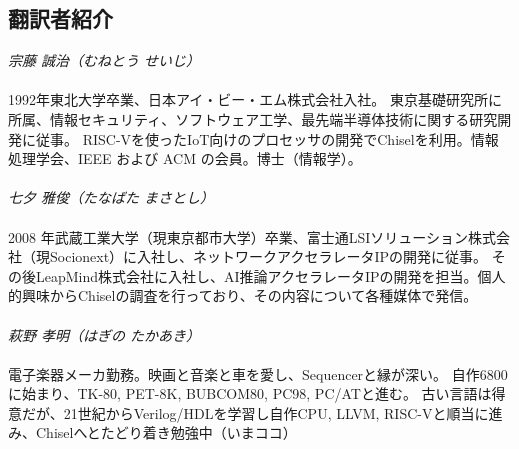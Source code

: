 \begin{minipage}{100mm}
\begin{spacing}{1.0}
\subsection*{翻訳者紹介}
\vspace{1mm}
\noindent
\emph{宗藤 誠治（むねとう せいじ）}
\\
\\[-3mm]
{\small
1992年東北大学卒業、日本アイ・ビー・エム株式会社入社。
東京基礎研究所に所属、情報セキュリティ、ソフトウェア工学、最先端半導体技術に関する研究開発に従事。
RISC-Vを使ったIoT向けのプロセッサの開発でChiselを利用。情報処理学会、IEEE および ACM の会員。博士（情報学）。
}
\\
\\[-1mm]
\noindent
\emph{七夕 雅俊（たなばた まさとし）}
\\
\\[-3mm]
{\small
2008 年武蔵工業大学（現東京都市大学）卒業、富士通LSIソリューション株式会社（現Socionext）に入社し、ネットワークアクセラレータIPの開発に従事。
その後LeapMind株式会社に入社し、AI推論アクセラレータIPの開発を担当。個人的興味からChiselの調査を行っており、その内容について各種媒体で発信。
}
\\
\\[-1mm]
\noindent
\emph{萩野 孝明（はぎの たかあき）}
\\
\\[-3mm]
{\small
電子楽器メーカ勤務。映画と音楽と車を愛し、Sequencerと縁が深い。
自作6800に始まり、TK-80, PET-8K, BUBCOM80, PC98, PC/ATと進む。
古い言語は得意だが、21世紀からVerilog/HDLを学習し自作CPU, LLVM, RISC-Vと順当に進み、Chiselへとたどり着き勉強中（いまココ）
}


\end{spacing}\end{minipage}

\clearpage

